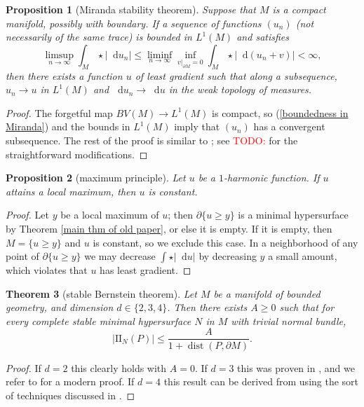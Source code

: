 \documentclass[reqno,11pt]{amsart}
\newcommand*\dif{\mathop{}\!\mathrm{d}}
\DeclareMathOperator{\dist}{dist}
\newcommand{\Two}{\mathrm{I\!I}}
\newtheorem{theorem}{Theorem}[section]
\newtheorem{proposition}[theorem]{Proposition}
\theoremstyle{definition}
\numberwithin{equation}{section}
\newcommand\todo[1]{\textcolor{red}{TODO: #1}}
\begin{document}
\begin{proposition}[Miranda stability theorem]
  Suppose that $M$ is a compact manifold, possibly with boundary.
	If a sequence of functions $(u_n)$ (not necessarily of the same trace) is bounded in $L^1(M)$ and satisfies
\begin{equation}\label{boundedness in Miranda}
	\limsup_{n \to \infty} \int_M \star |\dif u_n| \leq \liminf_{n \to \infty} \inf_{v|_{\partial M} = 0} \int_M \star |\dif(u_n + v)| < \infty,
\end{equation}
	then there exists a function $u$ of least gradient such that along a subsequence, $u_n \to u$ in $L^1(M)$ and $\dif u_n \to \dif u$ in the weak topology of measures.
\end{proposition}
\begin{proof}
The forgetful map $BV(M) \to L^1(M)$ is compact, so (\ref{boundedness in Miranda}) and the bounds in $L^1(M)$ imply that $(u_n)$ has a convergent subsequence.
The rest of the proof is similar to \cite[Teorema 3 and Osservazione 3]{Miranda67}; see \todo{\cite{BackusFLG}} for the straightforward modifications.
\end{proof}

\begin{proposition}[maximum principle]\label{max princip}
Let $u$ be a $1$-harmonic function.
If $u$ attains a local maximum, then $u$ is constant.
\end{proposition}
\begin{proof}
Let $y$ be a local maximum of $u$; then $\partial \{u \geq y\}$ is a minimal hypersurface by Theorem \ref{main thm of old paper}, or else it is empty. If it is empty, then $M = \{u \geq y\}$ and $u$ is constant, so we exclude this case.
In a neighborhood of any point of $\partial \{u \geq y\}$ we may decrease $\int \star |\dif u|$ by decreasing $y$ a small amount, which violates that $u$ has least gradient.
\end{proof}

\begin{theorem}[stable Bernstein theorem]
	Let $M$ be a manifold of bounded geometry, and dimension $d \in \{2, 3, 4\}$.
	Then there exists $A \geq 0$ such that for every complete stable minimal hypersurface $N$ in $M$ with trivial normal bundle,
	$$|\Two_N(P)| \leq \frac{A}{1 + \dist(P, \partial M)}.$$
\end{theorem}
\begin{proof}
	If $d = 2$ this clearly holds with $A = 0$.
	If $d = 3$ this was proven in \cite{Schoen2016}, and we refer to \cite[Theorem 2.10]{colding2011course} for a modern proof.
	If $d = 4$ this result can be derived from \cite[Theorem 1]{Chodosh2021} using the sort of techniques discussed in \cite[\S3]{White13}.
\end{proof}
\end{document}

